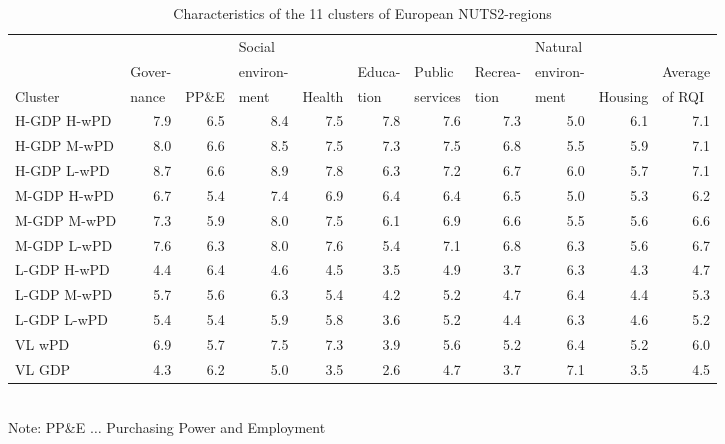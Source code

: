\documentclass[a4paper,twoside]{article}
\begin{document}
\begin{table}
\caption{Characteristics of the 11 clusters of European NUTS2-regions}
\label{tab:1}

{ \footnotesize
\setlength{\tabcolsep}{2pt}
    \begin{tabular*}{\textwidth}{lrrrrrrrrrr}
    \toprule
          &       & \multicolumn{1}{l}{} & \multicolumn{1}{l}{Social} &       &       &       &       & \multicolumn{1}{l}{Natural} &       &  \\
          & \multicolumn{1}{l}{Gover-} & \multicolumn{1}{l}{} & \multicolumn{1}{l}{environ-} &       & \multicolumn{1}{l}{Educa-} & \multicolumn{1}{l}{Public} & \multicolumn{1}{l}{Recrea-} & \multicolumn{1}{l}{environ-} &       & \multicolumn{1}{l}{Average} \\
    Cluster & \multicolumn{1}{l}{nance} & \multicolumn{1}{l}{PP\&E}  & \multicolumn{1}{l}{ment}  & \multicolumn{1}{l}{Health} & \multicolumn{1}{l}{tion}  & \multicolumn{1}{l}{services} & \multicolumn{1}{l}{tion}  & \multicolumn{1}{l}{ment}  & \multicolumn{1}{l}{Housing} & \multicolumn{1}{l}{of RQI} \\
    \midrule
    H-GDP H-wPD & 7.9   & 6.5   & 8.4   & 7.5   & 7.8   & 7.6   & 7.3   & 5.0   & 6.1   & 7.1 \\
    H-GDP M-wPD & 8.0   & 6.6   & 8.5   & 7.5   & 7.3   & 7.5   & 6.8   & 5.5   & 5.9   & 7.1 \\
    H-GDP L-wPD & 8.7   & 6.6   & 8.9   & 7.8   & 6.3   & 7.2   & 6.7   & 6.0   & 5.7   & 7.1 \\[3mm]
    M-GDP H-wPD & 6.7   & 5.4   & 7.4   & 6.9   & 6.4   & 6.4   & 6.5   & 5.0   & 5.3   & 6.2 \\
    M-GDP M-wPD & 7.3   & 5.9   & 8.0   & 7.5   & 6.1   & 6.9   & 6.6   & 5.5   & 5.6   & 6.6 \\
    M-GDP L-wPD & 7.6   & 6.3   & 8.0   & 7.6   & 5.4   & 7.1   & 6.8   & 6.3   & 5.6   & 6.7 \\[3mm]
    L-GDP H-wPD & 4.4   & 6.4   & 4.6   & 4.5   & 3.5   & 4.9   & 3.7   & 6.3   & 4.3   & 4.7 \\
    L-GDP M-wPD & 5.7   & 5.6   & 6.3   & 5.4   & 4.2   & 5.2   & 4.7   & 6.4   & 4.4   & 5.3 \\
    L-GDP L-wPD & 5.4   & 5.4   & 5.9   & 5.8   & 3.6   & 5.2   & 4.4   & 6.3   & 4.6   & 5.2 \\[3mm]
    VL wPD      & 6.9   & 5.7   & 7.5   & 7.3   & 3.9   & 5.6   & 5.2   & 6.4   & 5.2   & 6.0 \\
    VL GDP      & 4.3   & 6.2   & 5.0   & 3.5   & 2.6   & 4.7   & 3.7   & 7.1   & 3.5   & 4.5 \\
    \bottomrule
    \end{tabular*}%
\\[3mm]Note: PP\&E $\ldots$ Purchasing Power and Employment
}
\end{table}
\end{document}
